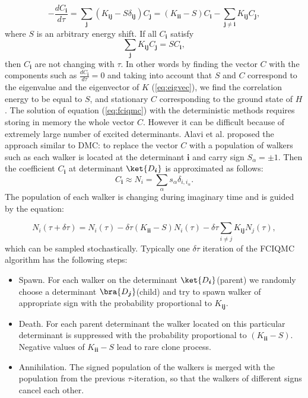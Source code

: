 \documentclass[twoside,english]{uiofysmaster}
\begin{document}
\begin{equation}\label{eq:fciqmc}
	-\frac{d C_{\boldsymbol{i}}}{d \tau} = \sum_{\boldsymbol{j}}(K_{\boldsymbol{ij}} - S\delta_{\boldsymbol{ij}}) C_{\boldsymbol{j}} = (K_{\boldsymbol{ii}} - S)C_{\boldsymbol{i}} - \sum_{\boldsymbol{j} \neq \boldsymbol{i}}K_{\boldsymbol{ij}}C_{\boldsymbol{j}},
\end{equation}
where $S$ is an arbitrary energy shift. If all $C_{\boldsymbol{i}}$ satisfy 
\begin{equation}\label{eq:eigvec}
\sum_{\boldsymbol{j}} K_{\boldsymbol{ij}}C_{\boldsymbol{j}} = S C_{\boldsymbol{i}},
\end{equation}
then $C_{\boldsymbol{i}}$ are not changing with $\tau$. In other words by finding the vector $C$ with the components such as $\frac{dC_{\boldsymbol{i}}}{d\tau} = 0$ and taking into account that $S$ and $C$ correspond to the eigenvalue and the eigenvector of $K$ (\ref{eq:eigvec}), we find the correlation energy to be equal to $S$, and stationary $C$ corresponding to the ground state of $H$.
The solution of equation (\ref{eq:fciqmc}) with the deterministic methods requires storing in memory the whole vector $C$. However it can be difficult because of extremely large number of excited determinants. Alavi et al. \cite{BoothFermionMonteCarlo2009} proposed the approach similar to DMC: to replace the vector $C$ with a population of walkers such as each walker is located at the determinant $\boldsymbol{i}$ and carry sign $S_\alpha = \pm 1$. Then the coefficient $C_{\boldsymbol{i}}$ at determinant $\ket{D_{\boldsymbol{i}}}$ is approximated as follows: 
\begin{equation}
	C_{\boldsymbol{i}} \approx N_i = \sum_{\alpha} s_\alpha \delta_{i, i_\alpha}.
\end{equation}
The population of each walker is changing during imaginary time and is guided by the equation:

\begin{equation}
	N_i(\tau + \delta\tau) = N_i(\tau) - \delta\tau ( K_{\boldsymbol{ii}}-S)N_i(\tau) - \delta \tau \sum_{i \neq j}  K_{\boldsymbol{ij}}N_j(\tau),
\end{equation}
which can be sampled stochastically.
Typically one $\delta\tau$ iteration of the FCIQMC algorithm has the following steps:
\begin{itemize}
	\item Spawn. For each walker on the determinant $\ket{D_{\boldsymbol{i}}}$(parent) we randomly choose a determinant $\bra{D_{\boldsymbol{j}}}$(child) and try to spawn walker of appropriate sign with the probability proportional to $K_{\boldsymbol{ij}}$.
	\item Death. For each parent determinant the walker located on this particular determinant is suppressed with the probability proportional to $(K_{\boldsymbol{ii}}-S)$. Negative values of $K_{\boldsymbol{ii}}-S$ lead to rare clone process.
	\item Annihilation. The signed population of the walkers is merged with the population from the previous $\tau$-iteration, so that the walkers of different signs cancel each other.
\end{itemize}
\end{document}
